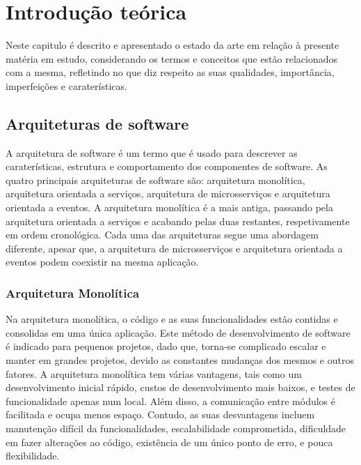 
\chapter{Introdução teórica}	%
\label{Chapter2}	%

Neste capitulo é descrito e apresentado o estado da arte em relação à presente matéria em estudo, considerando os termos e conceitos que estão relacionados com a mesma, refletindo no que diz respeito as suas qualidades, importância, imperfeições e caraterísticas.

\section{Arquiteturas de software}
A arquitetura de software é um termo que é usado para descrever as caraterísticas, estrutura e comportamento dos componentes de software. As quatro principais arquiteturas de software são: arquitetura monolítica, arquitetura orientada a serviços, arquitetura de microsserviços e arquitetura orientada a eventos. A arquitetura monolítica é a mais antiga, passando pela arquitetura orientada a serviços e acabando pelas duas restantes, respetivamente em ordem cronológica. Cada uma das arquiteturas segue uma abordagem diferente, apesar que, a arquitetura de microsserviços e arquitetura orientada a eventos podem coexistir na mesma aplicação.

\subsection{Arquitetura Monolítica}

Na arquitetura monolítica, o código e as suas funcionalidades estão contidas e consolidas em uma única aplicação. Este método de desenvolvimento de software é indicado para pequenos projetos, dado que, torna-se complicado escalar e manter em grandes projetos, devido as constantes mudanças dos mesmos e outros fatores.
A arquitetura monolítica tem várias vantagens, tais como um desenvolvimento inicial rápido, custos de desenvolvimento mais baixos, e testes de funcionalidade apenas num local. Além disso, a comunicação entre módulos é facilitada e ocupa menos espaço. Contudo, as suas desvantagens incluem manutenção difícil da funcionalidades, escalabilidade comprometida, dificuldade em fazer alterações ao código, existência de um único ponto de erro, e pouca flexibilidade.

